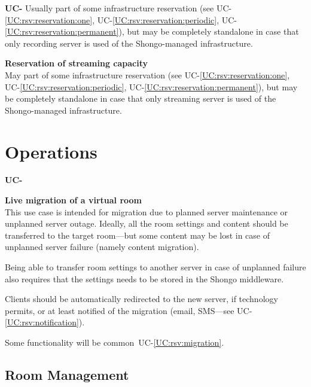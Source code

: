 \documentclass[a4paper]{report}
\makeatletter
\newcounter{UCcounter}
\newenvironment{UseCases}%
	{\begin{list}{\textbf{UC-\arabic{UCcounter}}}{\@nmbrlisttrue\def\@listctr{UCcounter}}}%
	{\end{list}}
\newcommand{\UClabel}[1]{\label{UC:#1}}
\newcommand{\UCref}[1]{UC-\ref{UC:#1}}
\newcommand{\UseCase}[2]{\item\UClabel{#2} \textbf{#1}\\}
\makeatother
\begin{document}
\begin{UseCases}
Usually part of some infrastructure reservation (see
\UCref{rsv:reservation:one}, \UCref{rsv:reservation:periodic},
\UCref{rsv:reservation:permanent}), but may be completely standalone in case
that only recording server is used of the Shongo-managed infrastructure.


\UseCase{Reservation of streaming capacity}{rsv:streaming}

May part of some infrastructure reservation (see \UCref{rsv:reservation:one},
\UCref{rsv:reservation:periodic}, \UCref{rsv:reservation:permanent}), but may
be completely standalone in case that only streaming server is used of the
Shongo-managed infrastructure.

\end{UseCases}


\section{Operations}

\begin{UseCases}

\UseCase{Live migration of a virtual room}{ops:migration}

This use case is intended for migration due to planned server maintenance or
unplanned server outage.  Ideally, all the room settings and content should be
transferred to the target room---but some content may be lost in case of
unplanned server failure (namely content migration).

Being able to transfer room settings to another server in case of unplanned
failure also requires that the settings needs to be stored in the Shongo
middleware.

Clients should be automatically redirected to the new server, if technology
permits, or at least notified of the migration (email, SMS---see
\UCref{rsv:notification}).

Some functionality will be common~\UCref{rsv:migration}.

\end{UseCases}

\subsection{Room Management}
\end{document}

